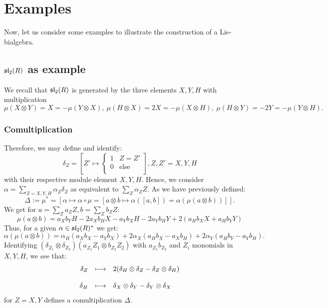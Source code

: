 \section{Examples}
Now, let us consider some examples to illustrate the construction of a Lie-bialgebra.
\subsection{$\sltwor$ as example}
We recall that $\sltwor$ is generated by the three elements $X, Y, H$ with multiplication
$$\mu(X \otimes Y) = X = -\mu(Y \otimes X),\ \mu(H \otimes X) = 2 X = - \mu(X \otimes H),\ \mu(H \otimes Y) = -2 Y = - \mu(Y \otimes H).$$
\subsubsection{Comultiplication}
Therefore, we may define and identify:
$$\delta_Z = \left[Z' \longmapsto \begin{cases}
1 & Z = Z'\\
0 & \mathrm{else}\\
\end{cases}\right], Z, Z' = X, Y, H$$
with their respective module element $X, Y, H$. Hence, we consider $\alpha = \sum_{Z = X, Y, H} \alpha_Z \delta_Z$ as equivalent to $\sum_{Z} \alpha_Z Z$. As we have previously defined:
$$\Delta := \mu^\ast = \left[\alpha \longmapsto \alpha \circ \mu = \left[a \otimes b \longmapsto \alpha([a,b]) = \alpha(\mu(a\otimes b))\right]\right].$$
We get for $a = \sum_Z a_Z Z, b = \sum_Z b_Z Z$:
$$\mu(a \otimes b) = a_X b_Y H - 2 a_X b_H X - a_Y b_X H - 2 a_Y b_H Y + 2(a_H b_X X + a_H b_Y Y)$$
Thus, for a given $\alpha \in \sltwor^\ast$ we get:
$$\alpha(\mu(a \otimes b)) = \alpha_H (a_X b_X - a_Y b_X) + 2\alpha_X(a_H b_X - a_X b_H) + 2 \alpha_Y(a_H b_Y - a_Y b_H).$$
Identifying $(\delta_{Z_1} \otimes \delta_{Z_2})(a_{Z_1} Z_1 \otimes b_{Z_2} Z_2)$ with $a_{Z_1} b_{Z_2}$ and $Z_i$ monomials in $X, Y, H$, we see that:
$$\bao{rcl}
\delta_Z &\longmapsto& 2 (\delta_H \otimes \delta_Z - \delta_Z \otimes \delta_H)\\
&&\\
\delta_H &\longmapsto& \delta_X \otimes \delta_Y - \delta_Y \otimes \delta_X\\
\ea$$
for $Z = X, Y$ defines a comultiplication $\Delta$.
